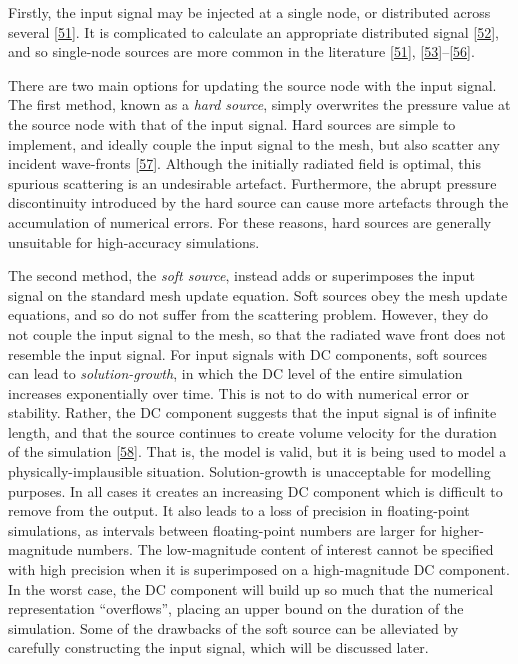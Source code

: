 \documentclass[]{scrreprt}
\begin{document}
Firstly, the input signal may be injected at a single node, or
distributed across several
{[}\protect\hyperlink{ref-jeongux5fsourceux5f2012}{51}{]}. It is
complicated to calculate an appropriate distributed signal
{[}\protect\hyperlink{ref-sakamotoux5fphase-errorux5f2007}{52}{]}, and
so single-node sources are more common in the literature
{[}\protect\hyperlink{ref-jeongux5fsourceux5f2012}{51}{]},
{[}\protect\hyperlink{ref-lamux5ftimeux5f2012}{53}{]}--{[}\protect\hyperlink{ref-dimitrijevicux5foptimizationux5f2015}{56}{]}.

There are two main options for updating the source node with the input
signal. The first method, known as a \emph{hard source}, simply
overwrites the pressure value at the source node with that of the input
signal. Hard sources are simple to implement, and ideally couple the
input signal to the mesh, but also scatter any incident wave-fronts
{[}\protect\hyperlink{ref-schneiderux5fimplementationux5f1998}{57}{]}.
Although the initially radiated field is optimal, this spurious
scattering is an undesirable artefact. Furthermore, the abrupt pressure
discontinuity introduced by the hard source can cause more artefacts
through the accumulation of numerical errors. For these reasons, hard
sources are generally unsuitable for high-accuracy simulations.

The second method, the \emph{soft source}, instead adds or superimposes
the input signal on the standard mesh update equation. Soft sources obey
the mesh update equations, and so do not suffer from the scattering
problem. However, they do not couple the input signal to the mesh, so
that the radiated wave front does not resemble the input signal. For
input signals with DC components, soft sources can lead to
\emph{solution-growth}, in which the DC level of the entire simulation
increases exponentially over time. This is not to do with numerical
error or stability. Rather, the DC component suggests that the input
signal is of infinite length, and that the source continues to create
volume velocity for the duration of the simulation
{[}\protect\hyperlink{ref-sheafferux5fphysically-constrainedux5f2012}{58}{]}.
That is, the model is valid, but it is being used to model a
physically-implausible situation. Solution-growth is unacceptable for
modelling purposes. In all cases it creates an increasing DC component
which is difficult to remove from the output. It also leads to a loss of
precision in floating-point simulations, as intervals between
floating-point numbers are larger for higher-magnitude numbers. The
low-magnitude content of interest cannot be specified with high
precision when it is superimposed on a high-magnitude DC component. In
the worst case, the DC component will build up so much that the
numerical representation ``overflows'', placing an upper bound on the
duration of the simulation. Some of the drawbacks of the soft source can
be alleviated by carefully constructing the input signal, which will be
discussed later.
\end{document}
